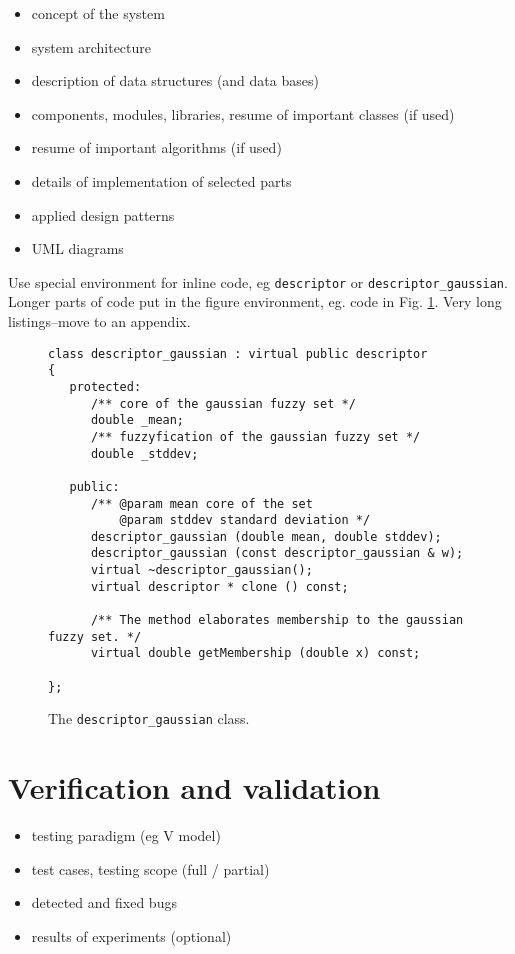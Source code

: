 \documentclass[a4paper,twoside,12pt]{book}
\begin{document}
\begin{itemize}
\item concept of the system
\item system architecture
\item description of data structures (and data bases)
\item components, modules, libraries, resume of important classes (if used)
\item resume of important algorithms (if used)
\item details of implementation of selected parts
\item applied design patterns
\item UML diagrams
\end{itemize}


Use special environment for inline code, eg \lstinline|descriptor| or \lstinline|descriptor_gaussian|.
Longer parts of code put in the figure environment, eg. code in Fig. \ref{fig:pseudokod}. Very long listings–move to an appendix.

\begin{figure}
\centering
\begin{lstlisting}
class descriptor_gaussian : virtual public descriptor
{
   protected:
      /** core of the gaussian fuzzy set */
      double _mean;
      /** fuzzyfication of the gaussian fuzzy set */
      double _stddev;

   public:
      /** @param mean core of the set
          @param stddev standard deviation */
      descriptor_gaussian (double mean, double stddev);
      descriptor_gaussian (const descriptor_gaussian & w);
      virtual ~descriptor_gaussian();
      virtual descriptor * clone () const;

      /** The method elaborates membership to the gaussian fuzzy set. */
      virtual double getMembership (double x) const;

};
\end{lstlisting}
\caption{The \lstinline|descriptor_gaussian| class.}
\label{fig:pseudokod}
\end{figure}


\chapter{Verification and validation}
\begin{itemize}
\item testing paradigm (eg V model)
\item test cases, testing scope (full / partial)
\item detected and fixed bugs
\item results of experiments (optional)
\end{itemize}
\end{document}
